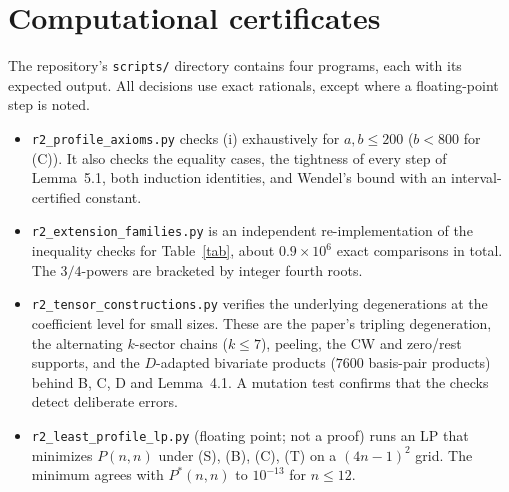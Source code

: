 \documentclass[11pt]{amsart}
\theoremstyle{remark}
\begin{document}
\section{Computational certificates}
The repository's \texttt{scripts/} directory contains four programs, each
with its expected output. All decisions use exact rationals, except where a
floating-point step is noted.
\begin{itemize}
\item \texttt{r2\_profile\_axioms.py} checks (i) exhaustively for
$a,b\le200$ ($b<800$ for (C)). It also checks the equality cases, the
tightness of every step of Lemma~5.1, both induction identities, and Wendel's
bound with an interval-certified constant.
\item \texttt{r2\_extension\_families.py} is an independent re-implementation
of the inequality checks for Table~\ref{tab}, about $0.9\times10^6$ exact
comparisons in total. The $3/4$-powers are bracketed by integer fourth roots.
\item \texttt{r2\_tensor\_constructions.py} verifies the underlying
degenerations at the coefficient level for small sizes. These are the paper's
tripling degeneration, the alternating $k$-sector chains ($k\le7$), peeling, the CW and zero/rest supports, and the
$D$-adapted bivariate products ($7600$ basis-pair products) behind B, C, D
and Lemma~4.1. A mutation test confirms that the checks detect deliberate
errors.
\item \texttt{r2\_least\_profile\_lp.py} (floating point; not a proof) runs
an LP that minimizes $P(n,n)$ under (S), (B), (C), (T) on a $(4n-1)^2$ grid.
The minimum agrees with $P^*(n,n)$ to $10^{-13}$ for $n\le12$.
\end{itemize}
\end{document}
